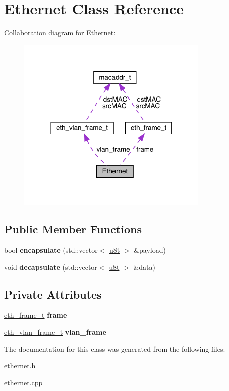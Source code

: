 \hypertarget{classEthernet}{}\section{Ethernet Class Reference}
\label{classEthernet}


Collaboration diagram for Ethernet\+:\nopagebreak
\begin{figure}[H]
\begin{center}
\leavevmode
\includegraphics[width=260pt]{classEthernet__coll__graph}
\end{center}
\end{figure}
\subsection*{Public Member Functions}
\begin{DoxyCompactItemize}
\item 
\mbox{\label{classEthernet_a0ee0a7b0720489214113bde0fb14fd12}} 
bool {\bfseries encapsulate} (std\+::vector$<$ \hyperlink{macros_8h_a176a4ab0531a048e0693a4520c550193}{u8t} $>$ \&payload)
\item 
\mbox{\label{classEthernet_a6a3304c3cd5c3b79049d24fcc2854f48}} 
void {\bfseries decapsulate} (std\+::vector$<$ \hyperlink{macros_8h_a176a4ab0531a048e0693a4520c550193}{u8t} $>$ \&data)
\end{DoxyCompactItemize}
\subsection*{Private Attributes}
\begin{DoxyCompactItemize}
\item 
\mbox{\label{classEthernet_a9d4e1ec352eb5209d5675592aebfdd85}} 
\hyperlink{structeth__frame__t}{eth\+\_\+frame\+\_\+t} {\bfseries frame}
\item 
\mbox{\label{classEthernet_ad6f419f6b4c1050af2d4b974186d862e}} 
\hyperlink{structeth__vlan__frame__t}{eth\+\_\+vlan\+\_\+frame\+\_\+t} {\bfseries vlan\+\_\+frame}
\end{DoxyCompactItemize}


The documentation for this class was generated from the following files\+:\begin{DoxyCompactItemize}
\item 
ethernet.\+h\item 
ethernet.\+cpp\end{DoxyCompactItemize}
